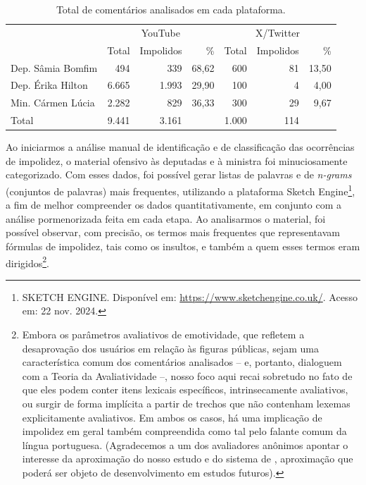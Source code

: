 \documentclass[portuguese]{textolivre}
\begin{document}
\begin{table}[h!]
\centering
\begin{threeparttable}
\caption{Total de comentários analisados em cada plataforma.}\label{tab-1}
\begin{tabular}{lrrrrrr}
\toprule
 & \multicolumn{3}{c}{YouTube} & \multicolumn{3}{c}{X/Twitter} \\
\cmidrule(lr){2-4} \cmidrule(lr){5-7}
 & Total & Impolidos & \% & Total & Impolidos & \% \\
\midrule
Dep. Sâmia Bomfim & 494 & 339 & 68{,}62 & 600 & 81 & 13{,}50 \\
Dep. Érika Hilton & 6.665 & 1.993 & 29{,}90 & 100 & 4 & 4{,}00 \\
Min. Cármen Lúcia & 2.282 & 829 & 36{,}33 & 300 & 29 & 9{,}67 \\
\midrule
Total & 9.441 & 3.161 &  & 1.000 & 114 &  \\
\bottomrule
\end{tabular}
\end{threeparttable}
\end{table}


Ao iniciarmos a análise manual de identificação e de classificação das ocorrências de impolidez, o material ofensivo às deputadas e à ministra foi minuciosamente categorizado. Com esses dados, foi possível gerar listas de palavras e de \textit{n-grams} (conjuntos de palavras) mais frequentes, utilizando a plataforma Sketch Engine\footnote{SKETCH ENGINE. Disponível em: \url{https://www.sketchengine.co.uk/}. Acesso em: 22 nov. 2024.}, a fim de melhor compreender os dados quantitativamente, em conjunto com a análise pormenorizada feita em cada etapa. Ao analisarmos o material, foi possível observar, com precisão, os termos mais frequentes que representavam fórmulas de impolidez, tais como os insultos, e também a quem esses termos eram dirigidos\footnote{Embora os parâmetros avaliativos de emotividade, que refletem a desaprovação dos usuários em relação às figuras públicas, sejam uma característica comum dos comentários analisados -- e, portanto, dialoguem com a Teoria da Avaliatividade \cite{martin2005} --, nosso foco aqui recai sobretudo no fato de que eles podem conter itens lexicais específicos, intrinsecamente avaliativos, ou surgir de forma implícita a partir de trechos que não contenham lexemas explicitamente avaliativos. Em ambos os casos, há uma implicação de impolidez em geral também compreendida como tal pelo falante comum da língua portuguesa. (Agradecemos a um dos avaliadores anônimos apontar o interesse da aproximação do nosso estudo e do sistema de \textcite{martin2005}, aproximação que poderá ser objeto de desenvolvimento em estudos futuros).}.
\end{document}
